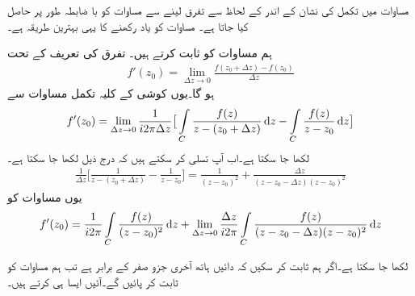  مساوات  میں تکمل کی نشان کے اندر  کے لحاظ سے تفرق لینے سے مساوات   کو با ضابطہ طور پر حاصل کیا جاتا ہے۔ مساوات   کو یاد رکھنے کا یہی بہترین طریقہ ہے۔

\quad
ہم مساوات  کو ثابت کرتے ہیں۔ تفرق کی تعریف کے تحت
\begin{align*}
f'(z_0)=\lim_{\Delta z\to 0} \frac{f(z_0+\Delta z)-f(z_0)}{\Delta z}
\end{align*}
ہو گا۔یوں کوشی کے کلیہ تکمل مساوات  سے
\begin{align}\label{مساوات_مخلوط_تکمل_تحلیلی_تفاعل_تفرق_پ}
f'(z_0)=\lim_{\Delta z \to 0} \frac{1}{i2\pi \Delta z}\big[\int\limits_C\frac{f(z)}{z-(z_0+\Delta z)}\dif z-\int\limits_C\frac{f(z)}{z-z_0}\dif z  \big]   
\end{align}
لکھا جا سکتا ہے۔اب آپ تسلی کر سکتے ہیں کہ درج ذیل لکھا جا سکتا ہے۔
\begin{align*}
\frac{1}{\Delta z}\big[\frac{1}{z-(z_0+\Delta z)}-\frac{1}{z-z_0}\big]=\frac{1}{(z-z_0)^2}+\frac{\Delta z}{(z-z_0-\Delta z)(z-z_0)^2}
\end{align*}
یوں مساوات  کو
\begin{align*}
f'(z_0)=\frac{1}{i2\pi}\int\limits_C \frac{f(z)}{(z-z_0)^2}\dif z+\lim_{\Delta z\to 0}\frac{\Delta z}{i2\pi}\int\limits_C\frac{f(z)}{(z-z_0-\Delta z)(z-z_0)^2}\dif z
\end{align*}

لکھا جا سکتا ہے۔اگر ہم ثابت کر سکیں کہ دائیں ہاتھ آخری جزو صفر کے برابر ہے تب ہم مساوات  کو ثابت کر پائیں گے۔آئیں ایسا ہی کرتے ہیں۔

